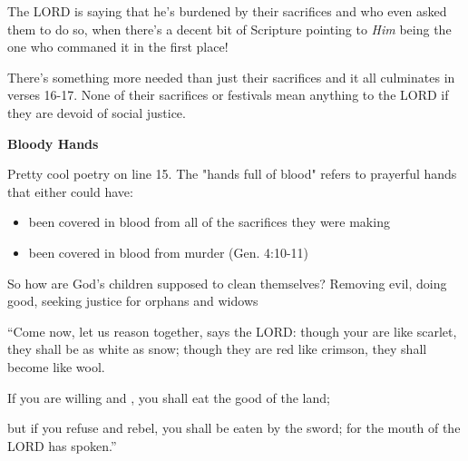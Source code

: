 \documentclass[11pt]{article}
\begin{document}
The LORD is saying that he's burdened by their sacrifices and who even asked them to do so, when there's a decent
bit of Scripture pointing to \textit{Him} being the one who commaned it in the first place!

{\vspace{1em}}
There's something more needed than just their sacrifices and it all culminates in verses 16-17. None of their sacrifices or festivals
mean anything to the LORD if they are devoid of social justice.

{\vspace{3em}}

{\large\bfseries Bloody Hands}
{\vspace{1em}}

Pretty cool poetry on line 15. The "hands full of blood" refers to prayerful hands that either could have:
\begin{itemize}
    \item been covered in blood from all of the sacrifices they were making
    \item been covered in blood from murder (Gen. 4:10-11)
\end{itemize}
{\vspace{1em}}


So how are God's children supposed to clean themselves? Removing evil, doing good, seeking justice for orphans and widows

\begin{biblicaloutline}[Isaiah 1:18-20]

    \begin{versesection}{2em}
 ``Come now, let us reason together, says the LORD:
\poetryline though your  are like scarlet,
\poetryline they shall be as white as snow;
though they are red like crimson,
\poetryline they shall become like wool.

 If you are willing and ,
\poetryline you shall eat the good of the land;

 but if you refuse and rebel,
\poetryline you shall be eaten by the sword;
\poetryline for the mouth of the LORD has spoken.''
    \end{versesection}

\end{biblicaloutline}
\end{document}
